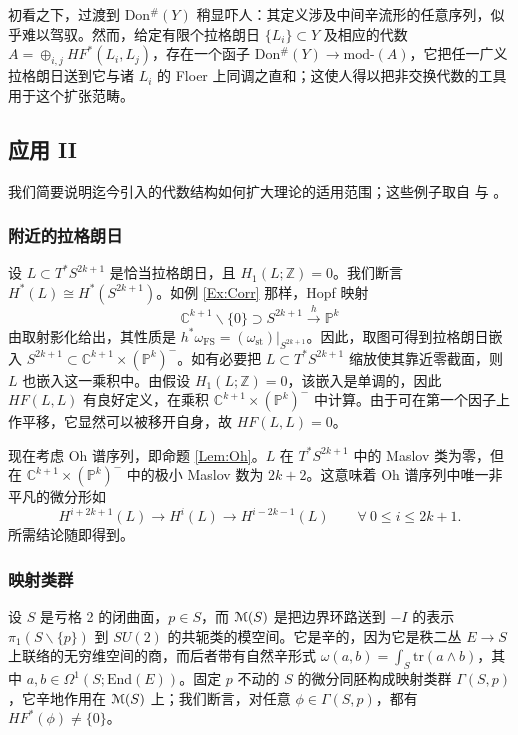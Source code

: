 \documentclass[11pt,a4paper]{article}
\numberwithin{equation}{section}
\newcommand{\bZ}{\mathbb{Z}}
\newcommand{\bC}{\mathbb{C}}
\newcommand{\bP}{\mathbb{P}}
\newcommand{\scrM}{\EuScript{M}}
\newcommand{\tr}{\mathrm{tr}}
\newcommand{\End}{\mathrm{End}}
\newcommand{\st}{\operatorname{st}}
\begin{document}
初看之下，过渡到 Don$^{\#}(Y)$ 稍显吓人：其定义涉及中间辛流形的任意序列，似乎难以驾驭。然而，给定有限个拉格朗日 $\{L_i\} \subset Y$ 及相应的代数 $A = \oplus_{i,j} HF^*(L_i, L_j)$，存在一个函子 Don$^{\#}(Y) \rightarrow \mathrm{mod}$-$(A)$，它把任一广义拉格朗日送到它与诸 $L_i$ 的 Floer 上同调之直和；这使人得以把非交换代数的工具用于这个扩张范畴。

\subsection{应用 II}

我们简要说明迄今引入的代数结构如何扩大理论的适用范围；这些例子取自 \cite{Buhovsky} 与 \cite{Smith:HFQuadrics}。

\subsubsection{附近的拉格朗日}

设 $L \subset T^*S^{2k+1}$ 是恰当拉格朗日，且 $H_1(L;\bZ) = 0$。我们断言 $H^*(L) \cong H^*(S^{2k+1})$。如例 \ref{Ex:Corr} 那样，Hopf 映射
\[
\bC^{k+1}\backslash \{0\} \supset S^{2k+1} \stackrel{h}{\longrightarrow} \bP^k
\]
由取射影化给出，其性质是 $h^*\omega_{\operatorname{FS}} = (\omega_{\st})|_{S^{2k+1}}$。因此，取图可得到拉格朗日嵌入 $S^{2k+1} \subset \bC^{k+1} \times (\bP^k)^-$。如有必要把 $L\subset T^*S^{2k+1}$ 缩放使其靠近零截面，则 $L$ 也嵌入这一乘积中。由假设 $H_1(L;\bZ) = 0$，该嵌入是单调的，因此 $HF(L,L)$ 有良好定义，在乘积 $\bC^{k+1} \times (\bP^k)^-$ 中计算。由于可在第一个因子上作平移，它显然可以被移开自身，故 $HF(L,L)=0$。

现在考虑 Oh 谱序列，即命题 \ref{Lem:Oh}。$L$ 在 $T^*S^{2k+1}$ 中的 Maslov 类为零，但在 $\bC^{k+1} \times (\bP^k)^-$ 中的极小 Maslov 数为 $2k+2$。这意味着 Oh 谱序列中唯一非平凡的微分形如
\[
H^{i+2k+1}(L) \rightarrow H^i(L) \rightarrow H^{i-2k-1}(L) \qquad \forall \ 0 \leq i \leq 2k+1.
\]
所需结论随即得到。

\subsubsection{映射类群}

设 $S$ 是亏格 2 的闭曲面，$p
\in S$，而 $\scrM(S)$ 是把边界环路送到 $-I$ 的表示 $\pi_1(S\backslash \{p\})$ 到 $SU(2)$ 的共轭类的模空间。它是辛的，因为它是秩二丛 $E \rightarrow S$ 上联络的无穷维空间的商，而后者带有自然辛形式 $\omega(a,b) = \int_S \tr(a \wedge b)$，其中 $a,b \in \Omega^1(S;\End(E))$。固定 $p$ 不动的 $S$ 的微分同胚构成映射类群 $\Gamma(S,p)$，它辛地作用在 $\scrM(S)$ 上；我们断言，对任意 $\phi \in \Gamma(S,p)$，都有 $HF^*(\phi) \neq \{0\}$。
\end{document}
